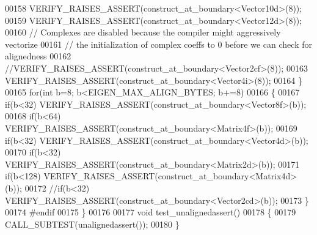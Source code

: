 \begin{DoxyCode}
00158     VERIFY\_RAISES\_ASSERT(construct\_at\_boundary<Vector10d>(8));
00159     VERIFY\_RAISES\_ASSERT(construct\_at\_boundary<Vector12d>(8));
00160     \textcolor{comment}{// Complexes are disabled because the compiler might aggressively vectorize}
00161     \textcolor{comment}{// the initialization of complex coeffs to 0 before we can check for alignedness}
00162     \textcolor{comment}{//VERIFY\_RAISES\_ASSERT(construct\_at\_boundary<Vector2cf>(8));}
00163     VERIFY\_RAISES\_ASSERT(construct\_at\_boundary<Vector4i>(8));
00164   \}
00165   \textcolor{keywordflow}{for}(\textcolor{keywordtype}{int} b=8; b<EIGEN\_MAX\_ALIGN\_BYTES; b+=8)
00166   \{
00167     \textcolor{keywordflow}{if}(b<32)  VERIFY\_RAISES\_ASSERT(construct\_at\_boundary<Vector8f>(b));
00168     \textcolor{keywordflow}{if}(b<64)  VERIFY\_RAISES\_ASSERT(construct\_at\_boundary<Matrix4f>(b));
00169     \textcolor{keywordflow}{if}(b<32)  VERIFY\_RAISES\_ASSERT(construct\_at\_boundary<Vector4d>(b));
00170     \textcolor{keywordflow}{if}(b<32)  VERIFY\_RAISES\_ASSERT(construct\_at\_boundary<Matrix2d>(b));
00171     \textcolor{keywordflow}{if}(b<128) VERIFY\_RAISES\_ASSERT(construct\_at\_boundary<Matrix4d>(b));
00172     \textcolor{comment}{//if(b<32)  VERIFY\_RAISES\_ASSERT(construct\_at\_boundary<Vector2cd>(b));}
00173   \}
00174 \textcolor{preprocessor}{#endif}
00175 \}
00176 
00177 \textcolor{keywordtype}{void} test\_unalignedassert()
00178 \{
00179   CALL\_SUBTEST(unalignedassert());
00180 \}
\end{DoxyCode}
